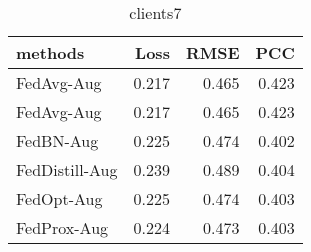 \begin{table}
\caption{clients7}
\begin{tabular}{lrrr}
\toprule
methods & Loss & RMSE & PCC \\
\midrule
FedAvg-Aug & 0.217 & 0.465 & 0.423 \\
FedAvg-Aug & 0.217 & 0.465 & 0.423 \\
FedBN-Aug & 0.225 & 0.474 & 0.402 \\
FedDistill-Aug & 0.239 & 0.489 & 0.404 \\
FedOpt-Aug & 0.225 & 0.474 & 0.403 \\
FedProx-Aug & 0.224 & 0.473 & 0.403 \\
\bottomrule
\end{tabular}
\end{table}
